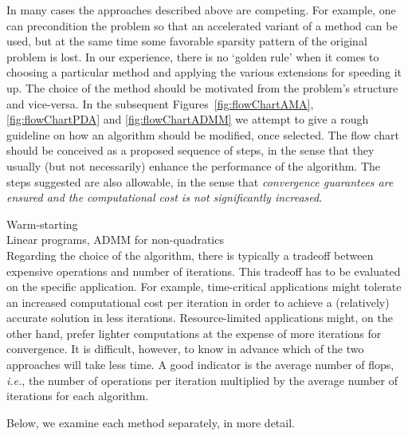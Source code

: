 \documentclass[openany]{now}
\newcommand{\ie}{{\it i.e.}}
\begin{document}
In many cases the approaches described above are competing. For example, one can precondition the problem so that an accelerated variant of a method can be used, but at the same time some favorable sparsity pattern of the original problem is lost.
In our experience, there is no `golden rule' when it comes to choosing a particular method and applying the various extensions for speeding it up. The choice of the method should be motivated from the problem's structure and vice-versa. In the subsequent Figures~\ref{fig:flowChartAMA}, \ref{fig:flowChartPDA} and \ref{fig:flowChartADMM} we attempt to give a rough guideline on how an algorithm should be modified, once selected. The flow chart should be conceived as a proposed sequence of steps, in the sense that they usually (but not necessarily) enhance the performance of the algorithm. The steps suggested are also allowable, in the sense that \emph{convergence guarantees are ensured and the computational cost is not significantly increased}.


Warm-starting\\
Linear programs, ADMM for non-quadratics\\
Regarding the choice of the algorithm, there is typically a tradeoff between expensive operations and number of iterations. This tradeoff has to be evaluated on the specific application. For example, time-critical applications might tolerate an increased computational cost per iteration in order to achieve a (relatively) accurate solution in less iterations. Resource-limited applications might, on the other hand, prefer lighter computations at the expense of more iterations for convergence. It is difficult, however, to know in advance which of the two approaches will take less time. A good indicator is the average number of flops, \ie, the number of operations per iteration multiplied by the average number of iterations for each algorithm. 

Below, we examine each method separately, in more detail.\\
\end{document}
